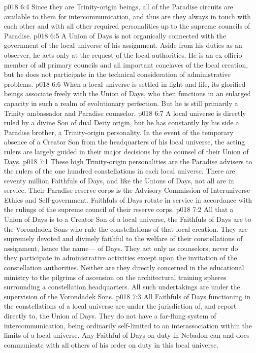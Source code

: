 \vs p018 6:4 Since they are Trinity\hyp{}origin beings, all of the Paradise circuits are available to them for intercommunication, and thus are they always in touch with each other and with all other required personalities up to the supreme councils of Paradise.
\pc \vs p018 6:5 A Union of Days is not organically connected with the government of the local universe of his assignment. Aside from his duties as an observer, he acts only at the request of the local authorities. He is an ex officio member of all primary councils and all important conclaves of the local creation, but he does not participate in the technical consideration of administrative problems.
\vs p018 6:6 When a local universe is settled in light and life, its glorified beings associate freely with the Union of Days, who then functions in an enlarged capacity in such a realm of evolutionary perfection. But he is still primarily a Trinity ambassador and Paradise counselor.
\vs p018 6:7 A local universe is directly ruled by a divine Son of dual Deity origin, but he has constantly by his side a Paradise brother, a Trinity\hyp{}origin personality. In the event of the temporary absence of a Creator Son from the headquarters of his local universe, the acting rulers are largely guided in their major decisions by the counsel of their Union of Days.
\vs p018 7:1 These high Trinity\hyp{}origin personalities are the Paradise advisers to the rulers of the one hundred constellations in each local universe. There are seventy million Faithfuls of Days, and like the Unions of Days, not all are in service. Their Paradise reserve corps is the Advisory Commission of Interuniverse Ethics and Self\hyp{}government. Faithfuls of Days rotate in service in accordance with the rulings of the supreme council of their reserve corps.\plusone
\vs p018 7:2 All that a Union of Days is to a Creator Son of a local universe, the Faithfuls of Days are to the Vorondadek Sons who rule the constellations of that local creation. They are supremely devoted and divinely faithful to the welfare of their constellations of assignment, hence the name--- of Days. They act only as counselors; never do they participate in administrative activities except upon the invitation of the constellation authorities. Neither are they directly concerned in the educational ministry to the pilgrims of ascension on the architectural training spheres surrounding a constellation headquarters. All such undertakings are under the supervision of the Vorondadek Sons.
\vs p018 7:3 All Faithfuls of Days functioning in the constellations of a local universe are under the jurisdiction of, and report directly to, the Union of Days. They do not have a far\hyp{}flung system of intercommunication, being ordinarily self\hyp{}limited to an interassociation within the limits of a local universe. Any Faithful of Days on duty in Nebadon can and does communicate with all others of his order on duty in this local universe.
